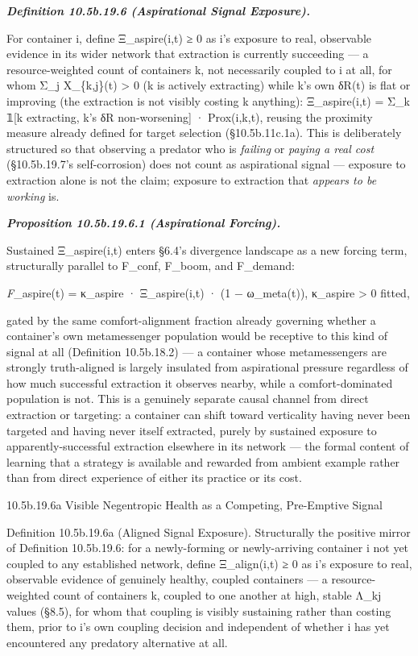 \documentclass[
]{article}
\begin{document}
\emph{\textbf{Definition 10.5b.19.6 (Aspirational Signal Exposure).}}

For container i, define Ξ\_aspire(i,t) ≥ 0 as i's exposure to real,
observable evidence in its wider network that extraction is currently
succeeding --- a resource-weighted count of containers k, not
necessarily coupled to i at all, for whom Σ\_j X\_\{k,j\}(t)
\textgreater{} 0 (k is actively extracting) while k's own δR(t) is flat
or improving (the extraction is not visibly costing k anything):
Ξ\_aspire(i,t) = Σ\_k 𝟙{[}k extracting, k's δR non-worsening{]} ·
Prox(i,k,t), reusing the proximity measure already defined for target
selection (§10.5b.11c.1a). This is deliberately structured so that
observing a predator who is \emph{failing} or \emph{paying a real cost}
(§10.5b.19.7's self-corrosion) does not count as aspirational signal ---
exposure to extraction alone is not the claim; exposure to extraction
that \emph{appears to be working} is.

\emph{\textbf{Proposition 10.5b.19.6.1 (Aspirational Forcing).}}

Sustained Ξ\_aspire(i,t) enters §6.4's divergence landscape as a new
forcing term, structurally parallel to F\_conf, F\_boom, and F\_demand:

\emph{F}\_aspire(t) = κ\_aspire · Ξ\_aspire(i,t) · (1 − ω\_meta(t)),
κ\_aspire \textgreater{} 0 fitted,

gated by the same comfort-alignment fraction already governing whether a
container's own metamessenger population would be receptive to this kind
of signal at all (Definition 10.5b.18.2) --- a container whose
metamessengers are strongly truth-aligned is largely insulated from
aspirational pressure regardless of how much successful extraction it
observes nearby, while a comfort-dominated population is not. This is a
genuinely separate causal channel from direct extraction or targeting: a
container can shift toward verticality having never been targeted and
having never itself extracted, purely by sustained exposure to
apparently-successful extraction elsewhere in its network --- the formal
content of learning that a strategy is available and rewarded from
ambient example rather than from direct experience of either its
practice or its cost.

10.5b.19.6a Visible Negentropic Health as a Competing, Pre-Emptive
Signal

Definition 10.5b.19.6a (Aligned Signal Exposure). Structurally the
positive mirror of Definition 10.5b.19.6: for a newly-forming or
newly-arriving container i not yet coupled to any established network,
define Ξ\_align(i,t) ≥ 0 as i's exposure to real, observable evidence of
genuinely healthy, coupled containers --- a resource-weighted count of
containers k, coupled to one another at high, stable Λ\_kj values
(§8.5), for whom that coupling is visibly sustaining rather than costing
them, prior to i's own coupling decision and independent of whether i
has yet encountered any predatory alternative at all.
\end{document}
